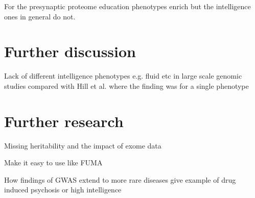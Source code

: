 For the presynaptic proteome education phenotypes enrich but the intelligence ones in general do not. 

\section{Further discussion}
Lack of different intelligence phenotypes e.g. fluid etc in large scale genomic studies compared with Hill et al. where the finding was for a single phenotype
\section{Further research}
Missing heritability and the impact of exome data

Make it easy to use like FUMA

How findings of GWAS extend to more rare diseases give example of drug induced psychosis or high intelligence